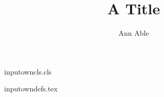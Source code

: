 \begin{filecontents*}[force]{inputowncls.cls}
\newcount\aucount
\def\author#1{\advance\aucount by 1 \gdef\@author{#1}}
\def\auaddr{}
\renewcommand\maketitle{\par{\@title\par}\ifnum\aucount>0 {\@author\par}{\auaddr}\fi}
\end{filecontents*}
\begin{filecontents*}[force]{inputowndefs.tex}
\def\address#1{\g@addto@macro\auaddr{#1\par}}
\end{filecontents*}
\documentclass{inputowncls}
\makeatletter\makeatother
\title{A Title}\author{Ann Able}
\address{Lunar Institute}
\maketitle
Body text.

